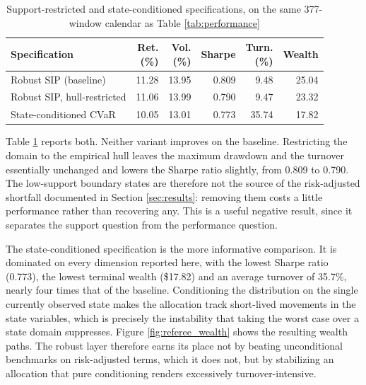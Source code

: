 \documentclass[smallcondensed]{svjour3}
\begin{document}
\begin{table}[!htbp]
\centering
\caption{Support-restricted and state-conditioned specifications, on the same
377-window calendar as Table \ref{tab:performance}}
\label{tab:referee_benchmarks}
\small
\begin{tabular}{lrrrrr}
\toprule
\textbf{Specification} & \makecell[r]{\textbf{Ret.}\\\textbf{(\%)}} & \makecell[r]{\textbf{Vol.}\\\textbf{(\%)}} & \textbf{Sharpe} & \makecell[r]{\textbf{Turn.}\\\textbf{(\%)}} & \textbf{Wealth} \\
\midrule
Robust SIP (baseline) & 11.28 & 13.95 & 0.809 & 9.48 & 25.04 \\
Robust SIP, hull-restricted & 11.06 & 13.99 & 0.790 & 9.47 & 23.32 \\
State-conditioned CVaR & 10.05 & 13.01 & 0.773 & 35.74 & 17.82 \\
\bottomrule
\end{tabular}
\end{table}

Table \ref{tab:referee_benchmarks} reports both. Neither variant improves on the baseline. Restricting the domain to the
empirical hull leaves the maximum drawdown and the turnover essentially
unchanged and lowers the Sharpe ratio slightly, from 0.809 to 0.790. The
low-support boundary states are therefore not the source of the risk-adjusted
shortfall documented in Section \ref{sec:results}: removing them costs a little
performance rather than recovering any. This is a useful negative result, since
it separates the support question from the performance question.

The state-conditioned specification is the more informative comparison. It is
dominated on every dimension reported here, with the lowest Sharpe ratio
(0.773), the lowest terminal wealth (\$17.82) and an average turnover of
35.7\%, nearly four times that of the baseline. Conditioning the distribution on
the single currently observed state makes the allocation track short-lived
movements in the state variables, which is precisely the instability that taking
the worst case over a state domain suppresses. Figure \ref{fig:referee_wealth}
shows the resulting wealth paths. The robust layer therefore earns its place not
by beating unconditional benchmarks on risk-adjusted terms, which it does not,
but by stabilizing an allocation that pure conditioning renders excessively
turnover-intensive.
\end{document}
